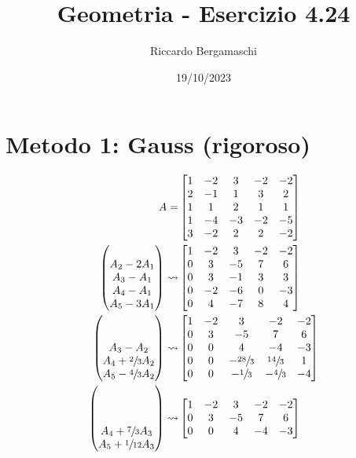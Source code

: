 \documentclass{article}
\title{Geometria - Esercizio 4.24}
\author{Riccardo Bergamaschi}
\date{19/10/2023}
\newcommand*{\mm}[1]{\begin{pmatrix}#1\end{pmatrix}}
\newcommand*{\m}[1]{\begin{bmatrix}#1\end{bmatrix}}
\begin{document}
\maketitle
\section*{Metodo 1: Gauss (rigoroso)}
\[\begin{aligned}
    A = &\m{
        1 & -2 &  3 & -2 & -2 \\
        2 & -1 &  1 &  3 &  2 \\
        1 &  1 &  2 &  1 &  1 \\
        1 & -4 & -3 & -2 & -5 \\
        3 & -2 &  2 &  2 & -2 \\
    }\\\mm{\\A_2-2A_1\\A_3-A_1\\A_4-A_1\\A_5-3A_1}\leadsto&\m{
        1 & -2 &  3 & -2 & -2 \\
        0 &  3 & -5 &  7 &  6 \\
        0 &  3 & -1 &  3 &  3 \\
        0 & -2 & -6 &  0 & -3 \\
        0 &  4 & -7 &  8 &  4 \\
    }\\\mm{\\\\A_3-A_2\\A_4+\sfrac{2}{3}A_2\\A_5-\sfrac{4}{3}A_2}\leadsto&\m{
        1 & -2 &  3 & -2 & -2 \\
        0 &  3 & -5 &  7 &  6 \\
        0 &  0 &  4 & -4 & -3 \\
        0 &  0 & -\sfrac{28}{3} & \sfrac{14}{3} & 1 \\
        0 &  0 & -\sfrac{1}{3}  & -\sfrac{4}{3} & -4 \\
    }\\\mm{\\\\\\A_4+\sfrac{7}{3}A_3\\A_5+\sfrac{1}{12}A_3}\leadsto&\m{
        1 & -2 &  3 & -2 & -2 \\
        0 &  3 & -5 &  7 &  6 \\
        0 &  0 &  4 & -4 & -3 \\
}
\end{aligned}\]
\end{document}
